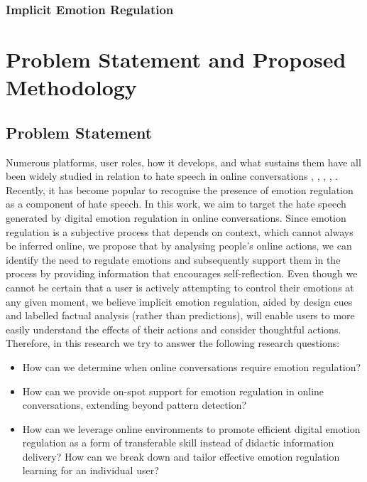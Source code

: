 \documentclass[acmtog]{acmart}
\begin{document}
\subsubsection{Implicit Emotion Regulation}



\section{Problem Statement and Proposed Methodology}
\subsection{Problem Statement}
Numerous platforms, user roles, how it develops, and what sustains them have all been widely studied in relation to hate speech in online conversations \cite{solovev2022moral}, \cite{saveski2021structure}, \cite{majo2020volume}, \cite{guberman2016quantifying}, \cite{konikoff2021gatekeepers}. Recently, it has become popular to recognise the presence of emotion regulation as a component of hate speech. In this work, we aim to target the hate speech generated by digital emotion regulation in online conversations. Since emotion regulation is a subjective process that depends on context, which cannot always be inferred online, we propose that by analysing people's online actions, we can identify the need to regulate emotions and subsequently support them in the process by providing information that encourages self-reflection. Even though we cannot be certain that a user is actively attempting to control their emotions at any given moment, we believe implicit emotion regulation, aided by design cues and labelled factual analysis (rather than predictions), will enable users to more easily understand the effects of their actions and consider thoughtful actions. Therefore, in this research we try to answer the following research questions:
\begin{itemize}
    \item How can we determine when online conversations require emotion regulation?
    \item How can we provide on-spot support for emotion regulation in online conversations, extending beyond pattern detection?
    \item How can we leverage online environments to promote efficient digital emotion regulation as a form of transferable skill instead of didactic information delivery? How can we break down and tailor effective emotion regulation learning for an individual user?
\end{itemize}
\end{document}
